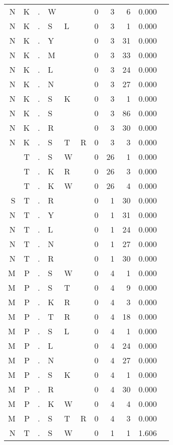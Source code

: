 \begin{longtable}{r@{ } r@{ } c@{ } l@{ } l@{ } l@{ } r r r r l }
N & K & . & W &   &   & 0 & 3 & 6 & 0.000 &  \\
N & K & . & S & L &   & 0 & 3 & 1 & 0.000 &  \\
N & K & . & Y &   &   & 0 & 3 & 31 & 0.000 &  \\
N & K & . & M &   &   & 0 & 3 & 33 & 0.000 &  \\
N & K & . & L &   &   & 0 & 3 & 24 & 0.000 &  \\
N & K & . & N &   &   & 0 & 3 & 27 & 0.000 &  \\
N & K & . & S & K &   & 0 & 3 & 1 & 0.000 &  \\
N & K & . & S &   &   & 0 & 3 & 86 & 0.000 &  \\
N & K & . & R &   &   & 0 & 3 & 30 & 0.000 &  \\
N & K & . & S & T & R & 0 & 3 & 3 & 0.000 &  \\
  & T & . & S & W &   & 0 & 26 & 1 & 0.000 &  \\
  & T & . & K & R &   & 0 & 26 & 3 & 0.000 &  \\
  & T & . & K & W &   & 0 & 26 & 4 & 0.000 &  \\
S & T & . & R &   &   & 0 & 1 & 30 & 0.000 &  \\
N & T & . & Y &   &   & 0 & 1 & 31 & 0.000 &  \\
N & T & . & L &   &   & 0 & 1 & 24 & 0.000 &  \\
N & T & . & N &   &   & 0 & 1 & 27 & 0.000 &  \\
N & T & . & R &   &   & 0 & 1 & 30 & 0.000 &  \\
M & P & . & S & W &   & 0 & 4 & 1 & 0.000 &  \\
M & P & . & S & T &   & 0 & 4 & 9 & 0.000 &  \\
M & P & . & K & R &   & 0 & 4 & 3 & 0.000 &  \\
M & P & . & T & R &   & 0 & 4 & 18 & 0.000 &  \\
M & P & . & S & L &   & 0 & 4 & 1 & 0.000 &  \\
M & P & . & L &   &   & 0 & 4 & 24 & 0.000 &  \\
M & P & . & N &   &   & 0 & 4 & 27 & 0.000 &  \\
M & P & . & S & K &   & 0 & 4 & 1 & 0.000 &  \\
M & P & . & R &   &   & 0 & 4 & 30 & 0.000 &  \\
M & P & . & K & W &   & 0 & 4 & 4 & 0.000 &  \\
M & P & . & S & T & R & 0 & 4 & 3 & 0.000 &  \\
N & T & . & S & W &   & 0 & 1 & 1 & 1.606 &  \\

\end{longtable}
